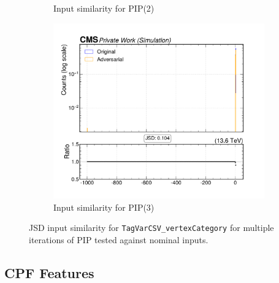 \begin{figure}[htbp]
\begin{subfigure}[t]{0.32\textwidth}
    \caption{Input similarity for PIP(2)}
  \end{subfigure}\hfill
  \begin{subfigure}[t]{0.32\textwidth}
    \includegraphics[width=\linewidth]{media/output/features/compare/intprob_3/cmp_global_features_TagVarCSV_vertexCategory.pdf}
    \caption{Input similarity for PIP(3)}
  \end{subfigure}

  \caption{JSD input similarity for \texttt{TagVarCSV\_vertexCategory} for multiple iterations of PIP tested against nominal inputs.}
  \label{fig:intprob_input_TagVarCSV_vertexCategory}
\end{figure}

\newpage
\subsection*{CPF Features}

